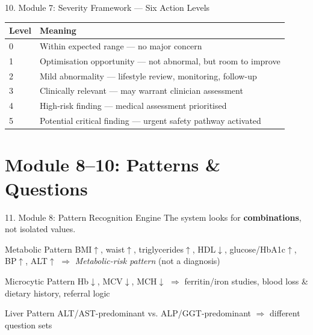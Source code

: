 \documentclass[10pt,aspectratio=169]{beamer}
\begin{document}
\begin{frame}{10. Module 7: Severity Framework --- Six Action Levels}
\scriptsize
\begin{center}
\begin{tabular}{@{}p{1.6cm}p{9.8cm}@{}}
\toprule
\textbf{Level} & \textbf{Meaning} \\
\midrule
0 & Within expected range --- no major concern \\
1 & Optimisation opportunity --- not abnormal, but room to improve \\
2 & Mild abnormality --- lifestyle review, monitoring, follow-up \\
3 & Clinically relevant --- may warrant clinician assessment \\
4 & High-risk finding --- medical assessment prioritised \\
5 & Potential critical finding --- urgent safety pathway activated \\
\bottomrule
\end{tabular}
\end{center}
\end{frame}

\section{Module 8--10: Patterns \& Questions}

\begin{frame}{11. Module 8: Pattern Recognition Engine}
The system looks for \textbf{combinations}, not isolated values.
\begin{exampleblock}{Metabolic Pattern}
\scriptsize BMI$\uparrow$, waist$\uparrow$, triglycerides$\uparrow$, HDL$\downarrow$, glucose/HbA1c$\uparrow$, BP$\uparrow$, ALT$\uparrow$ $\Rightarrow$ \textit{Metabolic-risk pattern} (not a diagnosis)
\end{exampleblock}
\begin{exampleblock}{Microcytic Pattern}
\scriptsize Hb$\downarrow$, MCV$\downarrow$, MCH$\downarrow$ $\Rightarrow$ ferritin/iron studies, blood loss \& dietary history, referral logic
\end{exampleblock}
\begin{exampleblock}{Liver Pattern}
\scriptsize ALT/AST-predominant vs. ALP/GGT-predominant $\Rightarrow$ different question sets
\end{exampleblock}
\end{frame}
\end{document}

